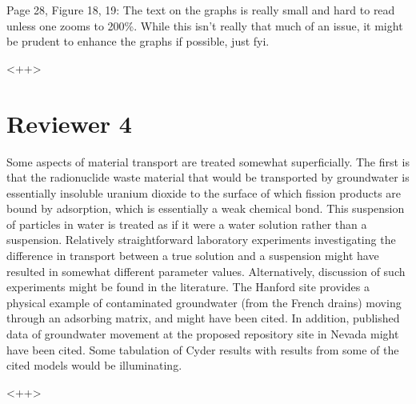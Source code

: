 \documentclass[answers,12pt]{exam}
\begin{document}
\begin{questions}
\question 
Page 28, Figure 18, 19: The text on the graphs is really small and hard to read unless one zooms to 200\%. 
While  this  isn't  really  that  much  of  an  issue,  it  might  be  prudent  to  enhance  the  graphs  if  possible,  just 
fyi.  
\begin{solution}
<++>
\end{solution} 
 


\section*{Reviewer 4}

\question  Some aspects of material transport are treated somewhat superficially. The
first is that the radionuclide waste material that would be transported by
groundwater is essentially insoluble uranium dioxide to the surface of which
fission products are bound by adsorption, which is essentially a weak chemical
bond.  This suspension of particles in water is treated as if it were a water
solution rather than a suspension.  Relatively straightforward laboratory
experiments investigating the difference in transport between a true solution
and a suspension might have resulted in somewhat different parameter values.
Alternatively, discussion of such experiments might be found in the literature.
The Hanford site provides a physical example of contaminated groundwater (from
the French drains) moving through an adsorbing matrix, and might have been
cited. In addition, published data of groundwater movement at the proposed
repository site in Nevada might have been cited.  Some tabulation of Cyder
results with results from some of the cited models would be illuminating. 
\begin{solution}
<++>
\end{solution}

\end{questions}
  
\end{document}
